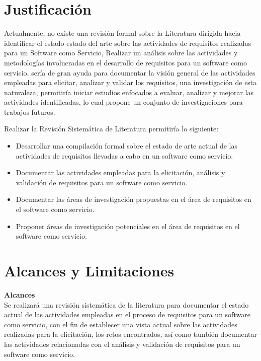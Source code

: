 \documentclass{article}
\begin{document}
\newpage

\section{Justificación}

Actualmente, no existe una revisión formal sobre la Literatura dirigida hacia identificar el estado estado del arte sobre las actividades de requisitos realizadas para un Software como Servicio, 
Realizar un análisis sobre las actividades y metodologías involucradas en el desarrollo de requisitos para un software como servicio, sería de gran ayuda para documentar la visión general de las actividades 
empleadas para elicitar, analizar y validar los requisitos, una investigación de esta naturaleza, permitiría iniciar estudios enfocados a evaluar, analizar y mejorar las actividades 
identificadas, lo cual propone un conjunto de investigaciones para trabajos futuros.

Realizar la Revisión Sistemática de Literatura permitiría lo siguiente: 

\begin{itemize}
    \item Desarrollar una compilación formal sobre el estado de arte actual de las actividades de requisitos llevadas a cabo en un software como servicio.
    \item Documentar las actividades empleadas para la elicitación, análisis y validación de requisitos para un software como servicio.
    \item Documentar las áreas de investigación propuestas  en el área de requisitos en el software como servicio.
    \item Proponer áreas de investigación potenciales en el área de requisitos en el software como servicio.
\end{itemize}
\newpage

\section{Alcances y Limitaciones}
\textbf{Alcances} \\
Se realizará una revisión sistemática de la literatura para documentar el estado actual de las actividades 
empleadas en el proceso de requisitos para un software como servicio, con el fin de establecer una vista 
actual sobre las actividades realizadas para la elicitación, los retos encontrados, así como también
documentar las actividades relacionadas con el análisis y validación de requisitos para un software como servicio. 
\end{document}
